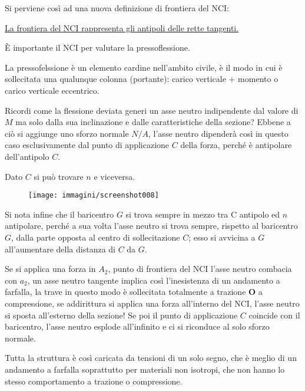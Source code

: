 \documentclass{article}
\begin{document}
\begin{adjustwidth}{2in}{}
		Si perviene così ad una nuova definizione di frontiera del NCI: 
		
		\hyperref[frontiera]{La frontiera del NCI rappresenta gli antipoli delle rette tangenti.} \newline
		
		È importante il NCI per valutare la pressoflessione. 
		
		La pressofelssione è un elemento cardine nell'ambito civile, è il modo in cui è sollecitata una qualunque colonna (portante): carico verticale + momento o carico verticale eccentrico. 
		
		Ricordi come la flessione deviata generi un asse neutro indipendente dal valore di $M$ ma solo dalla sua inclinazione e dalle caratteristiche della sezione? Ebbene a ciò si aggiunge uno sforzo normale $N/A$, l'asse neutro dipenderà così in questo caso esclusivamente dal punto di applicazione $C$ della forza, perché è antipolare dell'antipolo $C$.
		
		Dato $C$ si può trovare $n$ e viceversa.
		
\begin{figure}[H]
	\centering
	\texttt{[image: immagini/screenshot008]}
	\label{fig:screenshot008}
\end{figure}

		Si nota infine che il baricentro $G$ si trova sempre in mezzo tra C antipolo ed $n$ antipolare, perché a sua volta l’asse
		neutro si trova sempre, rispetto al baricentro $ G $, dalla parte opposta al centro di
		sollecitazione $ C $; esso si avvicina a $ G $ all’aumentare della distanza di $ C $ da $ G $. \newline 
		
		Se si applica una forza in $A_2$, punto di frontiera del NCI l'asse neutro combacia con $a_2$, un asse neutro tangente implica così l'inesistenza di un andamento a farfalla, la trave in questo modo è sollecitata totalmente a trazione \textbf{O} a compressione, se addirittura si applica una forza all'interno del NCI, l'asse neutro si sposta all'esterno della sezione! Se poi
		il punto di applicazione $ C $ coincide con il baricentro, l’asse neutro esplode all’infinito e ci si riconduce al solo sforzo
		normale. \newline
		
	
		Tutta la struttura è così caricata da tensioni di un solo segno, che è meglio di un andamento a farfalla soprattutto per materiali non isotropi, che non hanno lo stesso comportamento a trazione o compressione. 
		

\end{adjustwidth}
\end{document}
